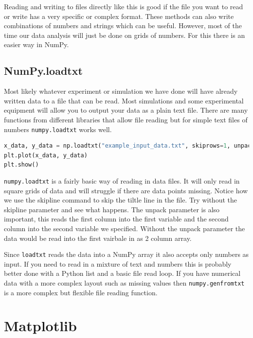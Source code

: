 Reading and writing to files directly like this is good if the file you want to read or write has a very specific or complex format. These methods can also write combinations of numbers and strings which can be useful. However, most of the time our data analysis will just be done on grids of numbers. For this there is an easier way in NumPy. 

	\subsection{NumPy.loadtxt}
		Most likely whatever experiment or simulation we have done will have already written data to a file that can be read. Most simulations and some experimental equipment will allow you to output your data as a plain text file. There are many functions from different libraries that allow file reading but for simple text files of numbers \texttt{numpy.loadtxt} works well.
		\begin{lstlisting}[language=Python]
x_data, y_data = np.loadtxt("example_input_data.txt", skiprows=1, unpack=True)
plt.plot(x_data, y_data)
plt.show()\end{lstlisting}

\texttt{numpy.loadtxt} is a fairly basic way of reading in data files. It will only read in square grids of data and will struggle if there are data points missing. Notice how we use the skipline command to skip the tiltle line in the file. Try without the skipline parameter and see what happens. The unpack parameter is also important, this reads the first column into the first variable and the second column into the second variable we specified. Without the unpack parameter the data would be read into the first vairbale in as 2 column array.

Since \texttt{loadtxt} reads the data into a NumPy array it also accepts only numbers as input. If you need to read in a mixture of text and numbers this is probably better done with a Python list and a basic file read loop. If you have numerical data with a more complex layout such as missing values then \texttt{numpy.genfromtxt} is a more complex but flexible file reading function.


\section{Matplotlib}
